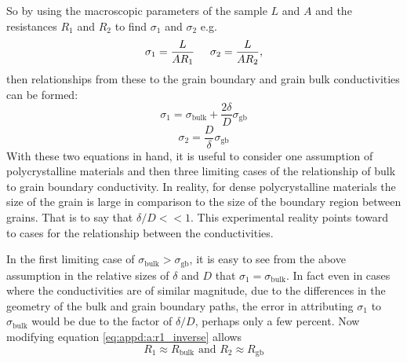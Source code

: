 So by using the macroscopic parameters of the sample $L$ and $A$ and the resistances $R_1$ and $R_2$ to find $\sigma_1$ and $\sigma_2$ e.g.
\begin{equation*}
    \sigma_1 = \frac{L}{A R_1} \hspace{.5cm} \sigma_2 = \frac{L}{A R_2},
\end{equation*}
then relationships from these to the grain boundary and grain bulk conductivities can be formed:
\begin{equation}
    \sigma_1=\sigma_{\mathrm{bulk}}+\frac{2\delta}{D}\sigma_{\mathrm{gb}}
    \label{eq:appd:s_1to_s_bulk}
\end{equation}
\begin{equation}
    \sigma_2 = \frac{D}{\delta}\sigma_{\mathrm{gb}}
    \label{eq:appd:s_2to_s_gb}
\end{equation}
With these two equations in hand, it is useful to consider one assumption of polycrystalline materials and then three limiting cases of the relationship of bulk to grain boundary conductivity. In reality, for dense polycrystalline materials the size of the grain is large in comparison to the size of the boundary region between grains. That is to say that $\delta/D<<1$. This experimental reality points toward to cases for the relationship between the conductivities.



In the first limiting case of $\sigma_{\mathrm{bulk}}>\sigma_{\mathrm{gb}}$, it is easy to see from the above assumption in the relative sizes of $\delta$ and $D$ that $\sigma_1 = \sigma_\mathrm{bulk}$. In fact even in cases where the conductivities are of similar magnitude, due to the differences in the geometry of the bulk and grain boundary paths, the error in attributing $\sigma_1$ to $\sigma_{\mathrm{bulk}}$ would be due to the factor of $\delta/D$, perhaps only a few percent. Now modifying equation \ref{eq:appd:a:r1_inverse} allows 
\begin{equation}
    R_1 \approx R_{\mathrm{bulk}} \text{ and } R_2 \approx R_{\mathrm{gb}}
    \label{eq:appd:r1_reducedTo_r_bulk}
\end{equation}

